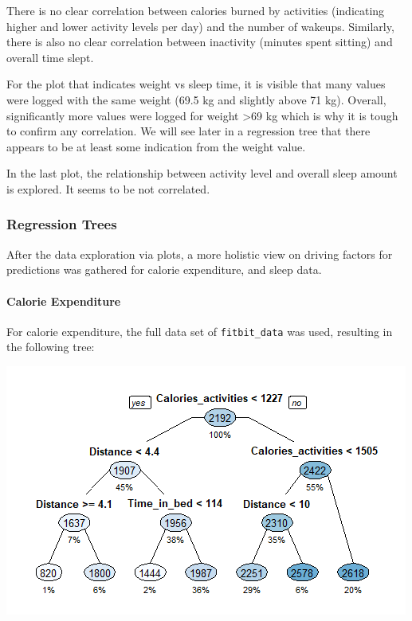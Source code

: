 \documentclass[
]{article}
\begin{document}
There is no clear correlation between calories burned by activities
(indicating higher and lower activity levels per day) and the number of
wakeups. Similarly, there is also no clear correlation between
inactivity (minutes spent sitting) and overall time slept.

For the plot that indicates weight vs sleep time, it is visible that
many values were logged with the same weight (69.5 kg and slightly above
71 kg). Overall, significantly more values were logged for weight
\textgreater69 kg which is why it is tough to confirm any correlation.
We will see later in a regression tree that there appears to be at least
some indication from the weight value.

In the last plot, the relationship between activity level and overall
sleep amount is explored. It seems to be not correlated.

\hypertarget{regression-trees}{%
\subsubsection{Regression Trees}\label{regression-trees}}

After the data exploration via plots, a more holistic view on driving
factors for predictions was gathered for calorie expenditure, and sleep
data.

\hypertarget{calorie-expenditure}{%
\paragraph{Calorie Expenditure}\label{calorie-expenditure}}

For calorie expenditure, the full data set of \texttt{fitbit\_data} was
used, resulting in the following tree:

\includegraphics{./f7923d3e7bd7aaef585d684a7090278b230ea30d.png}
\end{document}
